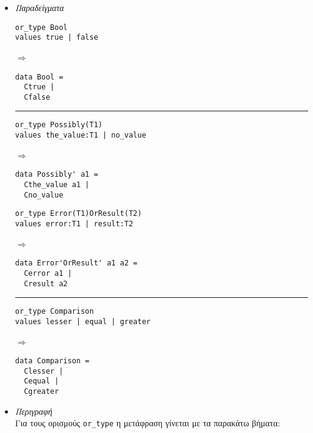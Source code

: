 \documentclass[diploma]{softlab-thesis}
\def\lra{$\Longrightarrow$\ }
\begin{document}
\begin{itemize}

\item
\textit{Παραδείγματα}

\begin{minipage}[t][9cm][t]{\linewidth}
\begin{minipage}{0.35\linewidth}
\begin{verbatim}
or_type Bool
values true | false
\end{verbatim}
\lra
\begin{verbatim}
data Bool =
  Ctrue |
  Cfalse
\end{verbatim}

\rule{\linewidth}{0.1pt}

\begin{verbatim}
or_type Possibly(T1)
values the_value:T1 | no_value
\end{verbatim}
\lra
\begin{verbatim}
data Possibly' a1 =
  Cthe_value a1 |
  Cno_value
\end{verbatim}

\end{minipage}
\hfill\vline\hfill
\begin{minipage}{0.45\linewidth}

\begin{verbatim}
or_type Error(T1)OrResult(T2)
values error:T1 | result:T2
\end{verbatim}
\lra
\begin{verbatim}
data Error'OrResult' a1 a2 =
  Cerror a1 |
  Cresult a2
\end{verbatim}

\rule{\linewidth}{0.1pt}

\begin{verbatim}
or_type Comparison
values lesser | equal | greater
\end{verbatim}
\lra
\begin{verbatim}
data Comparison =
  Clesser |
  Cequal |
  Cgreater
\end{verbatim}

\end{minipage}

\end{minipage}

\item
\textit{Περιγραφή}\\

Για τους ορισμούς \verb|or_type| η μετάφραση γίνεται με τα παρακάτω βήματα:

\begin{enumerate}


\end{enumerate}
\end{itemize}
\end{document}
